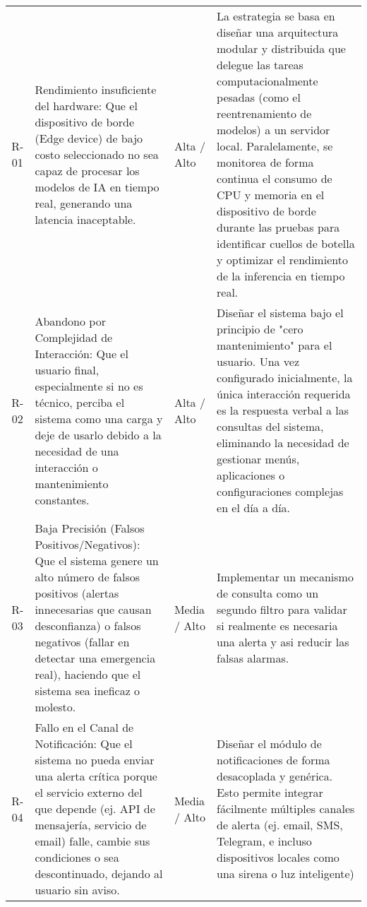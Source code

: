 {\begin{longtable}[c]{c p{5.8cm} >{\centering\arraybackslash}p{2cm} p{5.8cm}}
      R-01 & Rendimiento insuficiente del hardware: Que el dispositivo de borde (Edge device) de bajo costo seleccionado no sea capaz de procesar los modelos de IA en tiempo real, generando una latencia inaceptable.                                                        & Alta / Alto            & La estrategia se basa en diseñar una arquitectura modular y distribuida que delegue las tareas computacionalmente pesadas (como el reentrenamiento de modelos) a un servidor local. Paralelamente, se monitorea de forma continua el consumo de CPU y memoria en el dispositivo de borde durante las pruebas para identificar cuellos de botella y optimizar el rendimiento de la inferencia en tiempo real.                                              \\
      \addlinespace
      R-02 & Abandono por Complejidad de Interacción: Que el usuario final, especialmente si no es técnico, perciba el sistema como una carga y deje de usarlo debido a la necesidad de una interacción o mantenimiento constantes.                                            & Alta / Alto            & Diseñar el sistema bajo el principio de "cero mantenimiento" para el usuario. Una vez configurado inicialmente, la única interacción requerida es la respuesta verbal a las consultas del sistema, eliminando la necesidad de gestionar menús, aplicaciones o configuraciones complejas en el día a día.                                                                                                                                                  \\
      \addlinespace
      R-03 & Baja Precisión (Falsos Positivos/Negativos): Que el sistema genere un alto número de falsos positivos (alertas innecesarias que causan desconfianza) o falsos negativos (fallar en detectar una emergencia real), haciendo que el sistema sea ineficaz o molesto. & Media / Alto           & Implementar un mecanismo de consulta como un segundo filtro para validar si realmente es necesaria una alerta y asi reducir las falsas alarmas.                                                                                                                                                                                                                                                                                                           \\
      \addlinespace
      R-04 & Fallo en el Canal de Notificación: Que el sistema no pueda enviar una alerta crítica porque el servicio externo del que depende (ej. API de mensajería, servicio de email) falle, cambie sus condiciones o sea descontinuado, dejando al usuario sin aviso.       & Media / Alto           & Diseñar el módulo de notificaciones de forma desacoplada y genérica. Esto permite integrar fácilmente múltiples canales de alerta (ej. email, SMS, Telegram, e incluso dispositivos locales como una sirena o luz inteligente)                                                                                                                                                                                                                            \\

\end{longtable}}
